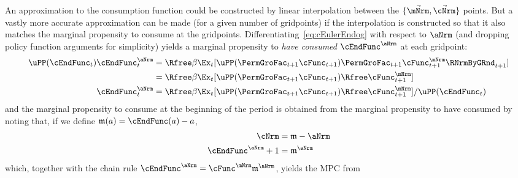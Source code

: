 \documentclass[\econtexRoot/BufferStockTheory]{subfiles}
\begin{document}
An approximation to the consumption function could be constructed by linear interpolation between the $\{\vec{\mNrm},\vec{\cNrm}\}$ points.
But a vastly more accurate approximation can be made (for a given number of gridpoints) if the interpolation is constructed so that it also matches the marginal propensity to consume at the gridpoints.
Differentiating~\eqref{eq:cEulerEndog} with respect to $\aNrm$ (and dropping policy function arguments for simplicity) yields a marginal propensity to \textit{have consumed} $\cEndFunc^{\aNrm}$ at each gridpoint:
\begin{equation}\begin{gathered}\begin{aligned}
\uPP(\cEndFunc_{t})\cEndFunc_{t}^{\aNrm}  & = \Rfree \beta \Ex_{t}[\uPP(\PermGroFac_{t+1} \cFunc_{t+1})\PermGroFac_{t+1} \cFunc^{\mNrm}_{t+1}\RNrmByGRnd_{t+1}] \notag
\\  & = \Rfree \beta \Ex_{t}[\uPP(\PermGroFac_{t+1} \cFunc_{t+1}) \Rfree \cFunc^{\mNrm}_{t+1}] \notag
\\ \cEndFunc_{t}^{\aNrm}  & = \Rfree \beta \Ex_{t}[\uPP(\PermGroFac_{t+1}  \cFunc_{t+1}) \Rfree \cFunc^{\mNrm}_{t+1}]/\uPP(\cEndFunc_{t}) \label{eq:MPTHC}
\end{aligned}\end{gathered}\end{equation}
and the marginal propensity to consume at the beginning of the period is obtained from the marginal
propensity to have consumed by noting that, if we define $\mathfrak{m}(a) = \cEndFunc(a)-a$,
\begin{align*}
   \cNrm  & = \mathfrak{m}-\aNrm
\\ \cEndFunc^{\aNrm}+1  & = \mathfrak{m}^{\aNrm}
\end{align*}
which, together with the chain rule $\cEndFunc^{\aNrm}  = \cFunc^{\mNrm}\mathfrak{m}^{\aNrm}$,
yields the MPC from
\end{document}
